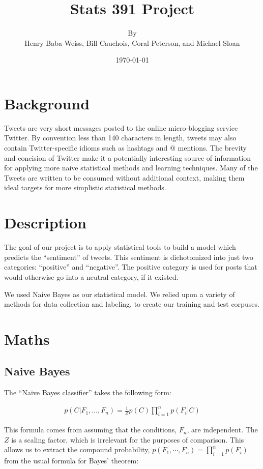 \documentclass[12pt,a4paper]{article}
\title{Stats 391 Project}
\author{By \\ Henry Baba-Weiss, Bill Cauchois, Coral Peterson, and Michael Sloan}
\date{\today}
\begin{document}
\maketitle
\pagebreak

\section { Background }

Tweets are very short messages posted to the online micro-blogging service Twitter. By convention less than 140 characters in length, tweets may also contain Twitter-specific idioms such as hashtags and @ mentions.  The brevity and concision of Twitter make it a potentially interesting source of information for applying more naive statistical methods and learning techniques.  Many of the Tweets are written to be consumed without additional context, making them ideal targets for more simplistic statistical methods.

\section { Description }

The goal of our project is to apply statistical tools to build a model which predicts the ``sentiment'' of tweets.  This sentiment is dichotomized into just two categories: ``positive'' and ``negative''.  The positive category is used for posts that would otherwise go into a neutral category, if it existed.

We used Naive Bayes as our statistical model. We relied upon a variety of methods for data collection and labeling, to create our training and test corpuses.


\section { Maths }

\subsection { Naive Bayes }

The ``Naive Bayes classifier'' takes the following form:

\begin{align*}
p(C \vert F_1,\dots,F_n) = \frac{1}{Z}  p(C) \prod_{i=1}^n p(F_i \vert C)
\end{align*}

This formula comes from assuming that the conditions, $ F_n $, are independent.  The $ Z $ is a scaling factor, which is irrelevant for the purposes of comparison.  This allows us to extract the compound probability, $ p(F_1,\cdots,F_n) = \prod_{i=1}^n p(F_i) $ from the usual formula for Bayes' theorem:
\end{document}
